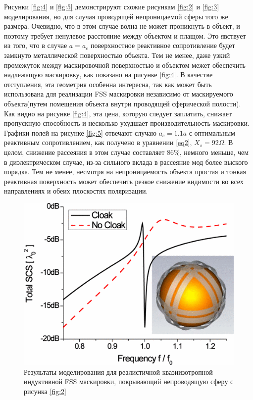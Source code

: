 \documentclass[12pt,a4paper]{article}
\begin{document}
Рисунки \ref{fig:4} и \ref{fig:5} демонстрируют схожие рисункам \ref{fig:2} и \ref{fig:3}
моделирования, но для случая проводящей непроницаемой сферы того же размера. Очевидно, что
в этом случае волна не может проникнуть в объект, и поэтому требует ненулевое расстояние
между объектом и плащом. Это явствует из того, что в случае $a=a_c$ поверхностное реактивное
сопротивление будет замкнуто металлической поверхностью объекта. Тем не менее, даже узкий
промежуток между маскировочной поверхностью и объектом межет обеспечить надлежащую 
маскировку, как показано на рисунке \ref{fig:4}. В качестве отступления, эта геометрия 
особенна интересна, так как может быть использована для реализации FSS маскировки
независимо от маскируемого объекта(путем помещения объекта внутри проводящей сферической 
полости). Как видно на рисунке \ref{fig:4}, эта цена, которую следует заплатить, снижает
пропускную способность и несколько ухудшает производительность маскировки. Графики полей
на рисунке \ref{fig:5} отвечают случаю $a_c=1.1a$ с оптимальным реактивным сопротивлением,
как получено в уравнении \ref{eq2}, $X_s=92\Omega$. В целом, снижение рассеяния в этом
случае составляет 86\%, немного меньше, чем в диэлектрическом случае, из-за сильного
вклада в рассеяние мод более выского порядка. Тем не менее, несмотря на непроницаемость 
объекта простая и тонкая реактивная поверхность может обеспечить резкое снижение видимости
во всех направлениях и обеих плоскостях поляризации. 

\begin{figure}[t]
  \centering
  \includegraphics[height=0.2\paperheight, width=0.4\paperwidth]{6.png}
  \caption{Результаты моделирования для реалистичной квазиизотропной индуктивной FSS 
  маскировки, покрывающий непроводящую сферу с рисунка \ref{fig:2}}
  \label{fig:6}
\end{figure}
\end{document}
